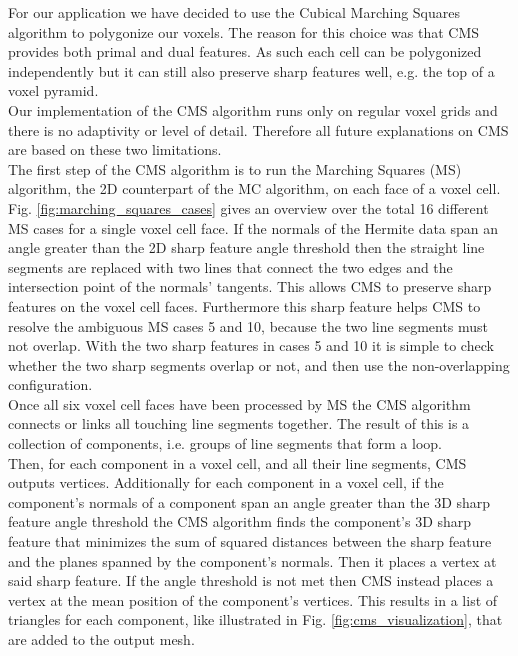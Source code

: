 For our application we have decided to use the Cubical Marching Squares algorithm \cite{cubical_marching_squares} to polygonize our voxels. The reason for this choice was
that CMS provides both primal and dual features. As such each cell can be polygonized independently but it can still also preserve sharp features well, e.g. the top of a voxel pyramid.\\
Our implementation of the CMS algorithm runs only on regular voxel grids and
there is no adaptivity or level of detail. Therefore all future explanations on CMS are based on these two limitations.\\
The first step of the CMS algorithm is to run the Marching Squares (MS) algorithm, the 2D counterpart of the MC algorithm, on each face of a voxel cell. Fig. \ref{fig:marching_squares_cases} gives an overview over the total 16 different MS cases for a single voxel cell face. If the normals of the Hermite data span an angle greater than the 2D sharp feature angle threshold then the straight line segments are replaced with two lines that connect the two edges and the intersection point of the normals' tangents. This allows CMS to preserve sharp features on the voxel cell faces. Furthermore this sharp feature helps CMS to resolve the ambiguous MS cases 5 and 10, because the two line segments must not overlap. With the two sharp features in cases 5 and 10 it is simple to check
whether the two sharp segments overlap or not, and then use the non-overlapping configuration.\\
Once all six voxel cell faces have been processed by MS the CMS algorithm connects or links all touching line segments together. The result of this is a collection of components, i.e. groups of line segments that form a loop.\\
Then, for each component in a voxel cell, and all their line segments, CMS outputs vertices. Additionally for each component in a voxel cell, if the component's normals of a component span an angle greater than the 3D sharp feature angle threshold the CMS algorithm finds the component's 3D sharp feature that minimizes the sum of squared distances between the sharp feature and the planes spanned by the component's normals. Then it places a vertex at said sharp feature. If the angle threshold is not met then CMS instead places a vertex at the mean position of the component's vertices. This results in a list of triangles for each component, like illustrated in Fig. \ref{fig:cms_visualization}, that are added to the output mesh.




